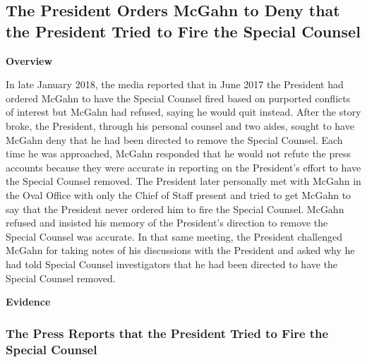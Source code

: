 {\subsection{The President Orders McGahn to Deny that the President Tried to Fire the Special Counsel}

\begin{center}
\textbf{Overview}
\end{center}

In late January 2018, the media reported that in June 2017 the President had ordered McGahn to have the Special Counsel fired based on purported conflicts of interest but McGahn had refused, saying he would quit instead.
After the story broke, the President, through his personal counsel and two aides, sought to have McGahn deny that he had been directed to remove the Special Counsel.
Each time he was approached, McGahn responded that he would not refute the press accounts because they were accurate in reporting on the President's effort to have the Special Counsel removed.
The President later personally met with McGahn in the Oval Office with only the Chief of Staff present and tried to get McGahn to say that the President never ordered him to fire the Special Counsel.
McGahn refused and insisted his memory of the President's direction to remove the Special Counsel was accurate.
In that same meeting, the President challenged McGahn for taking notes of his discussions with the President and asked why he had told Special Counsel investigators that he had been directed to have the Special Counsel removed.

\begin{center}
\textbf{Evidence}
\end{center}

\subsubsection{The Press Reports that the President Tried to Fire the Special Counsel}

}
